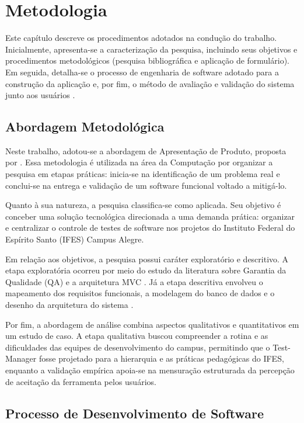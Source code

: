 \chapter{Metodologia}

Este capítulo descreve os procedimentos adotados na condução do trabalho. Inicialmente, apresenta-se a caracterização da pesquisa, incluindo seus objetivos e procedimentos metodológicos (pesquisa bibliográfica e aplicação de formulário). Em seguida, detalha-se o processo de engenharia de software adotado para a construção da aplicação e, por fim, o método de avaliação e validação do sistema junto aos usuários \cite{wazlawick2019}.

\section{Abordagem Metodológica}

Neste trabalho, adotou-se a abordagem de Apresentação de Produto, proposta por . Essa metodologia é utilizada na área da Computação por organizar a pesquisa em etapas práticas: inicia-se na identificação de um problema real e conclui-se na entrega e validação de um software funcional voltado a mitigá-lo.

Quanto à sua natureza, a pesquisa classifica-se como aplicada. Seu objetivo é conceber uma solução tecnológica direcionada a uma demanda prática: organizar e centralizar o controle de testes de software nos projetos do Instituto Federal do Espírito Santo (IFES) Campus Alegre.

Em relação aos objetivos, a pesquisa possui caráter exploratório e descritivo. A etapa exploratória ocorreu por meio do estudo da literatura sobre Garantia da Qualidade (QA) e a arquitetura MVC \cite{vasconcelos2006, delamaro2016}. Já a etapa descritiva envolveu o mapeamento dos requisitos funcionais, a modelagem do banco de dados e o desenho da arquitetura do sistema \cite{wazlawick2019}.

Por fim, a abordagem de análise combina aspectos qualitativos e quantitativos em um estudo de caso. A etapa qualitativa buscou compreender a rotina e as dificuldades das equipes de desenvolvimento do campus, permitindo que o Test-Manager fosse projetado para a hierarquia e as práticas pedagógicas do IFES, enquanto a validação empírica apoia-se na mensuração estruturada da percepção de aceitação da ferramenta pelos usuários.

\section{Processo de Desenvolvimento de Software}

